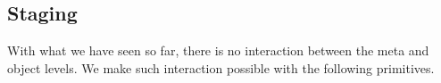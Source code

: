 \documentclass[acmsmall]{acmart}
\newcommand{\mbf}[1]{{\mathbf{#1}}}
\theoremstyle{remark}
\begin{document}



\subsection{Staging}\label{sec:staging}

With what we have seen so far, there is no interaction between the meta and
object levels. We make such interaction possible with the following primitives.
\end{document}
